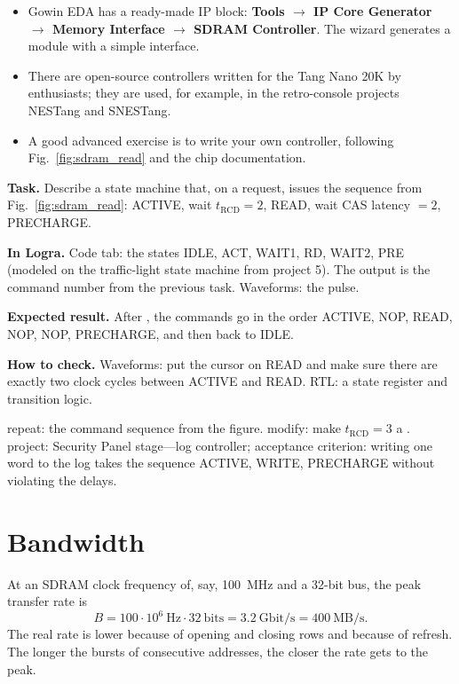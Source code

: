 \begin{infobox}
\begin{itemize}
  \item Gowin EDA has a ready-made IP block: \textbf{Tools $\to$ IP Core Generator
        $\to$ Memory Interface $\to$ SDRAM Controller}. The wizard
        generates a module with a simple interface.
  \item There are open-source controllers written for the Tang Nano 20K
        by enthusiasts; they are used, for example, in the retro-console projects NESTang and
        SNESTang.
  \item A good advanced exercise is to write your own controller,
        following Fig.~\ref{fig:sdram_read} and the chip documentation.
\end{itemize}
\end{infobox}

\begin{diybox}
\textbf{Task.} Describe a state machine that, on a  request, issues the sequence from Fig.~\ref{fig:sdram_read}: ACTIVE, wait $t_\text{RCD}=2$, READ, wait CAS latency $=2$, PRECHARGE.

\textbf{In Logra.} Code tab: the states IDLE, ACT, WAIT1, RD, WAIT2, PRE (modeled on the traffic-light state machine from project 5). The output is the command number from the previous task. Waveforms: the  pulse.

\textbf{Expected result.} After , the commands go in the order ACTIVE, NOP, READ, NOP, NOP, PRECHARGE, and then back to IDLE.

\textbf{How to check.} Waveforms: put the cursor on READ and make sure there are exactly two clock cycles between ACTIVE and READ. RTL: a state register and transition logic.

 repeat: the command sequence from the figure.  modify: make $t_\text{RCD}=3$ a .  project: Security Panel stage---log controller; acceptance criterion: writing one word to the log takes the sequence ACTIVE, WRITE, PRECHARGE without violating the delays.
\end{diybox}

\section{Bandwidth}

At an SDRAM clock frequency of, say, 100~MHz and a 32-bit bus, the peak
transfer rate is
\[
  B = 100 \cdot 10^6 \ \text{Hz} \cdot 32 \ \text{bits} = 3.2 \ \text{Gbit/s} = 400 \ \text{MB/s}.
\]
The real rate is lower because of opening and closing rows and because of
refresh. The longer the bursts of consecutive addresses, the closer the rate
gets to the peak.

